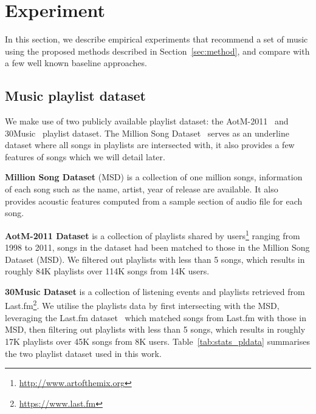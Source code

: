 \section{Experiment}
\label{sec:experiment}

In this section, we describe empirical experiments that recommend a set of music using the proposed methods
described in Section~\ref{sec:method}, and compare with a few well known baseline approaches.

\subsection{Music playlist dataset}
We make use of two publicly available playlist dataset: the AotM-2011~\cite{mcfee2012hypergraph} and 30Music~\cite{30music2015} playlist dataset.
The Million Song Dataset~\cite{msd2011} serves as an underline dataset where all songs in playlists are intersected with,
it also provides a few features of songs which we will detail later.

{\bf Million Song Dataset} (MSD) is a collection of one million songs, information of each song such as the name, artist, year of release are available.
It also provides acoustic features computed from a sample section of audio file for each song. %

{\bf AotM-2011 Dataset} is a collection of playlists shared by users\footnote{\url{http://www.artofthemix.org}} ranging from 1998 to 2011, 
songs in the dataset had been matched to those in the Million Song Dataset (MSD).
We filtered out playlists with less than 5 songs, which results in roughly 84K playlists over 114K songs from 14K users.

{\bf 30Music Dataset} is a collection of listening events and playlists retrieved from Last.fm\footnote{\url{https://www.last.fm}}.
We utilise the playlists data by first intersecting with the MSD, leveraging the Last.fm dataset~\cite{lastfmdataset} 
which matched songs from Last.fm with those in MSD, then filtering out playlists with less than 5 songs, 
which results in roughly 17K playlists over 45K songs from 8K users.
Table~\ref{tab:stats_pldata} summarises the two playlist dataset used in this work.
%
\begin{table}[!h]
\centering
\caption{Statistics of music playlist dataset}
\label{tab:stats_pldata}
\end{table}



